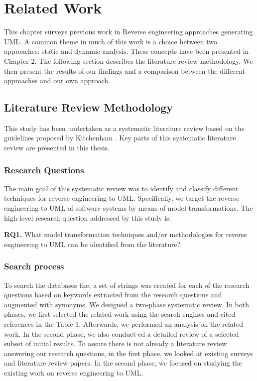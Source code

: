 \lhead{\emph{\leftmark}}  
\chapter{Related Work}
\label{chap:related}
This chapter surveys previous work in Reverse engineering approaches generating UML. A common theme in much of this work is a choice between two approaches: static and dynamic analysis. These concepts have been presented in Chapter 2. The following section describes the literature review methodology. We then present the results of our findings and a comparison between the different approaches and our own approach.

\section{Literature Review Methodology}

This study has been undertaken as a systematic literature review based on the guidelines proposed by Kitchenham \cite{kitchenham2004procedures}. Key parts of this systematic literature review are presented in this thesis.

\subsection{Research Questions}

The main goal of this systematic review was to identify and classify different techniques for reverse engineering to UML. Specifically, we target the reverse engineering to UML of software systems by means of model transformations. The high-level research question addressed by this study is:

\textbf{RQ1.} What model transformation techniques and/or methodologies for reverse engineering to UML can be identified from the literature?

\subsection{Search process}

To search the databases the, a set of strings was created for each of the research questions based on keywords extracted from the research questions and augmented with synonyms.
We designed a two-phase systematic review. In both phases, we first selected the related work using the search engines and cited references in the Table 1. Afterwards, we performed an analysis on the related work. In the second phase, we also conduct-ed a detailed review of a selected subset of initial results. To assure there is not already a literature review answering our research questions, in the first phase, we looked at existing surveys and literature review papers. In the second phase, we focused on studying the existing work on reverse engineering to UML. 

